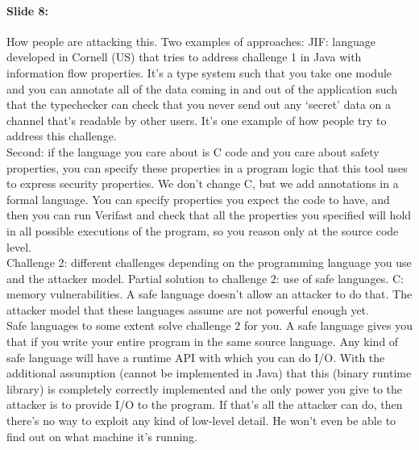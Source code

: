 \documentclass[10pt,a4paper]{report}
\begin{document}
\paragraph{Slide 8:} How people are attacking this. Two examples of approaches: JIF: language developed in Cornell (US) that tries to address challenge 1 in Java with information flow properties. It's a type system such that you take one module and you can annotate all of the data coming in and out of the application such that the typechecker can check that you never send out any `secret' data on a channel that's readable by other users. It's one example of how people try to address this challenge.\\
Second: if the language you care about is C code and you care about safety properties, you can specify these properties in a program logic that this tool uses to express security properties. We don't change C, but we add annotations in a formal language. You can specify properties you expect the code to have, and then you can run Verifast and check that all the properties you specified will hold in all possible executions of the program, so you reason only at the source code level.\\
Challenge 2: different challenges depending on the programming language you use and the attacker model. Partial solution to challenge 2: use of safe languages. C: memory vulnerabilities. A safe language doesn't allow an attacker to do that. The attacker model that these languages assume are not powerful enough yet.\\ 
Safe languages to some extent solve challenge 2 for you. A safe language gives you that if you write your entire program in the same source language. Any kind of safe language will have a runtime API with which you can do I/O. With the additional assumption (cannot be implemented in Java) that this (binary runtime library) is completely correctly implemented and the only power you give to the attacker is to provide I/O to the program. If that's all the attacker can do, then there's no way to exploit any kind of low-level detail. He won't even be able to find out on what machine it's running. 
\end{document}
